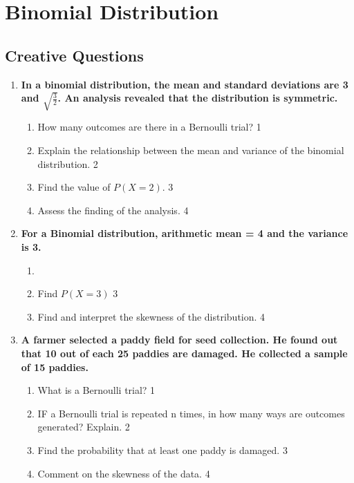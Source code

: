 \documentclass[a4paper,oneside]{book}
\begin{document}
\chapter{Binomial Distribution} 
\section{Creative Questions}
  \begin{enumerate}
  
   \item
  \textbf{In a binomial distribution, the mean and standard deviations are 3 and $\sqrt{\frac{3}{2}}$. An analysis revealed that the distribution is symmetric.} 

  
  \begin{enumerate}
     \item How many outcomes are there in a Bernoulli trial?  \hfill 1
    \item Explain the relationship between the mean and variance of the binomial distribution. \hfill 2
    \item  
	Find the value of $P(X=2)$. \hfill 3
    \item
	Assess the finding of the analysis. \hfill 4
  \end{enumerate}
  
   \item
	  \textbf{For a Binomial distribution, arithmetic mean = 4 and the variance is 3.} 
  
  \begin{enumerate}
    \item
    \item  
	Find $P(X = 3)$ \hfill 3
    \item
	Find and interpret the skewness of the distribution. \hfill 4
  \end{enumerate}
  
     \item
	  \textbf{A farmer selected a paddy field for seed collection. He found out that 10 out of each 25 paddies are damaged. He collected a sample of 15 paddies.} 
  
  \begin{enumerate}
    \item
	What is a Bernoulli trial? \hfill 1
    \item
	IF a Bernoulli trial is repeated n times, in how many ways are outcomes 
	generated? Explain. \hfill 2
    \item  
	Find the probability that at least one paddy is damaged. \hfill 3
    \item
	Comment on the skewness of the data. \hfill 4 
	

\end{enumerate}
\end{enumerate}
\end{document}
